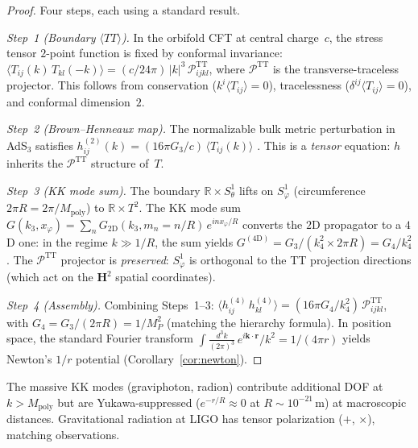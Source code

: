 \begin{proof}
Four steps, each using a standard result.

\emph{Step~1 (Boundary $\langle TT\rangle$).}
In the orbifold CFT at central charge~$c$, the stress tensor
$2$-point function is fixed by conformal invariance:
$\langle T_{ij}(k)\,T_{kl}({-}k)\rangle
  = (c/24\pi)\,|k|^3\,\mathcal{P}^{\mathrm{TT}}_{ijkl}$,
where $\mathcal{P}^{\mathrm{TT}}$ is the transverse-traceless projector.
This follows from conservation ($k^i\langle T_{ij}\rangle = 0$),
tracelessness ($\delta^{ij}\langle T_{ij}\rangle = 0$),
and conformal dimension~$2$.

\emph{Step~2 (Brown--Henneaux map).}
The normalizable bulk metric perturbation in AdS$_3$ satisfies
$h^{(2)}_{ij}(k) = (16\pi G_3/c)\,\langle T_{ij}(k)\rangle$
\citep{BrownHenneaux1986}.
This is a \emph{tensor} equation: $h$ inherits the
$\mathcal{P}^{\mathrm{TT}}$ structure of~$T$.

\emph{Step~3 (KK mode sum).}
The boundary $\mathbb{R}{\times}S^1_\theta$ lifts on $S^1_\varphi$
(circumference $2\pi R = 2\pi/M_{\mathrm{poly}}$) to
$\mathbb{R}{\times}T^2$.
The KK mode sum
$G(k_3, x_\varphi) = \sum_n G_{2\mathrm{D}}(k_3, m_n{=}n/R)\,
e^{in x_\varphi/R}$
converts the $2$D propagator to a $4$D one:
in the regime $k \gg 1/R$, the sum yields
$G^{(4\mathrm{D})} = G_3/(k_4^2 \times 2\pi R)
= G_4/k_4^2$.
The $\mathcal{P}^{\mathrm{TT}}$ projector is \emph{preserved}:
$S^1_\varphi$ is orthogonal to the TT projection directions
(which act on the $\mathbf{H}^2$ spatial coordinates).

\emph{Step~4 (Assembly).}
Combining Steps~1--3:
$\langle h^{(4)}_{ij}\,h^{(4)}_{kl}\rangle
= (16\pi G_4/k_4^2)\,\mathcal{P}^{\mathrm{TT}}_{ijkl}$,
with $G_4 = G_3/(2\pi R) = 1/M_P^2$ (matching the hierarchy formula).
In position space, the standard Fourier transform
$\int \frac{d^3k}{(2\pi)^3}\,e^{i\boldsymbol{k}{\cdot}\boldsymbol{r}}/k^2
= 1/(4\pi r)$ yields Newton's $1/r$ potential
(Corollary~\ref{cor:newton}).
\end{proof}

\noindent
The massive KK modes (graviphoton, radion) contribute additional DOF
at $k > M_{\mathrm{poly}}$ but are Yukawa-suppressed
($e^{-r/R} \approx 0$ at $R \sim 10^{-21}$\,m) at macroscopic distances.
Gravitational radiation at LIGO has tensor polarization ($+$, $\times$),
matching observations.

